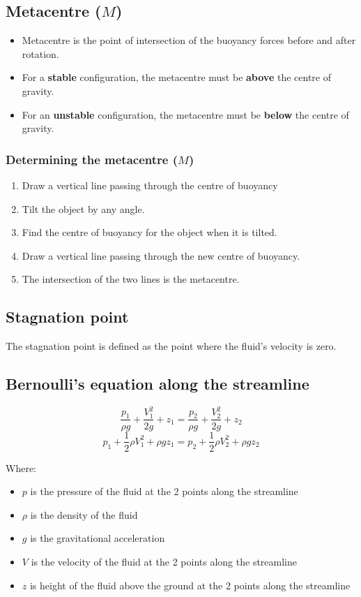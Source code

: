 \documentclass[11pt]{article}
\begin{document}
\subsection{Metacentre (\(M\))}
\label{sec:org8c2a5fb}
\begin{itemize}
\item Metacentre is the point of intersection of the buoyancy forces before and after rotation.
\item For a \textbf{stable} configuration, the metacentre must be \textbf{above} the centre of gravity.
\item For an \textbf{unstable} configuration, the metacentre must be \textbf{below} the centre of gravity.
\end{itemize}

\subsubsection{Determining the metacentre (\(M\))}
\label{sec:org2763e55}
\begin{enumerate}
\item Draw a vertical line passing through the centre of buoyancy
\item Tilt the object by any angle.
\item Find the centre of buoyancy for the object when it is tilted.
\item Draw a vertical line passing through the new centre of buoyancy.
\item The intersection of the two lines is the metacentre.
\end{enumerate}

\subsection{Stagnation point}
\label{sec:orge8be6b5}
The stagnation point is defined as the point where the fluid's velocity is zero.

\subsection{Bernoulli's equation along the streamline}
\label{sec:orge440ee4}
\[\frac{p_1}{\rho g} + \frac{V_1^2}{2g} + z_1 = \frac{p_2}{\rho g} + \frac{V_2^2}{2g} + z_2\]
\[p_1 + \frac{1}{2} \rho V_1^2 + \rho gz_1 = p_2 + \frac{1}{2} \rho V_2^2 + \rho gz_2\]

Where:
\begin{itemize}
\item \(p\) is the pressure of the fluid at the 2 points along the streamline
\item \(\rho\) is the density of the fluid
\item \(g\) is the gravitational acceleration
\item \(V\) is the velocity of the fluid at the 2 points along the streamline
\item \(z\) is height of the fluid above the ground at the 2 points along the streamline
\end{itemize}
\end{document}
